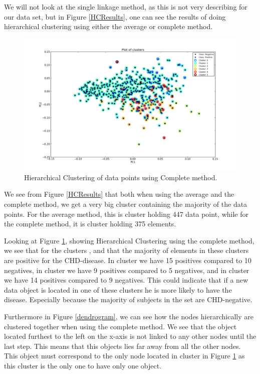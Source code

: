 We will not look at the single linkage method, as this is not very describing for our data set, but in Figure \ref{HCResults}, one can see the results of doing hierarchical clustering using either the average or complete method.

\begin{figure}[H]
\includegraphics[scale=0.4]{pictures/HCCom.png}
\caption{\footnotesize Hierarchical Clustering of data points using Complete method.}
\label{HCResultsCOM}
\end{figure}

We see from Figure \ref{HCResults} that both when using the average and the complete method, we get a very big cluster containing the majority of the data points. For the average method, this is cluster \HCAVGD{} holding 447 data point, while for the complete method, it is cluster \HCCOMD{}  holding 375 elements.

Looking at Figure \ref{HCResultsCOM}, showing Hierarchical Clustering using the complete method, we see that for the clusters \HCCOMA{}, \HCCOMB{} and \HCCOMC{} that the majority of elements in these clusters are positive for the CHD-disease. In cluster \HCCOMA{} we have 15 positives compared to 10 negatives, in cluster \HCCOMB{} we have 9 positives compared to 5 negatives, and in cluster \HCCOMC{} we have 14 positives compared to 9 negatives. This could indicate that if a new data object is located in one of these clusters he is more likely to have the disease. Especially because the majority of subjects in the set are CHD-negative.

Furthermore in Figure \ref{dendrogram}, we can see how the nodes hierarchically are clustered together when using the complete method. We see that the object located furthest to the left on the x-axis is not linked to any other nodes until the last step. This means that this objects lies far away from all the other nodes. This object must correspond to the only node located in cluster \HCCOMS{} in Figure \ref{HCResultsCOM} as this cluster is the only one to have only one object.

